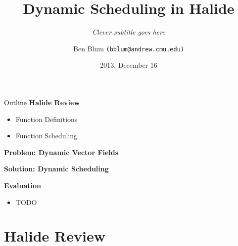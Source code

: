 \documentclass[xcolor=dvipsnames]{beamer}
\title[Dynamic Scheduling in Halide]{{\bf Dynamic Scheduling in Halide}}
\subtitle[]{ {\em Clever subtitle goes here}}
\author[Ben Blum]{Ben Blum \texttt{(bblum@andrew.cmu.edu)}}
\institute[CMU]{Carnegie Mellon University}
\date[]{2013, December 16}
\begin{document}
\renewcommand{\inserttotalframenumber}{28}
\normalem
\begin{frame}
	\titlepage
\end{frame}


\newcommand\linegap{\vspace{0.2in}}
\newcommand\breakslide[1]{\begin{frame}{} \begin{center} \Large #1 \end{center} \end{frame}}
\newcommand\related[1]{\textsuperscript{\em [#1]}}
\newcommand\hilight[2]{\color{#1}#2\color{black}}

\begin{frame}{Outline}
	\textbf{Halide Review}
	\begin{itemize}
		\item Function Definitions
		\item Function Scheduling
	\end{itemize}
	\linegap

	{\bf Problem: Dynamic Vector Fields}
	\linegap

	{\bf Solution: Dynamic Scheduling}
	\linegap

	{\bf Evaluation}
	\begin{itemize}
		\item TODO
	\end{itemize}
\end{frame}

\section{Halide Review}

\newcommand\code[1]{{\begin{center}\fbox{\begin{tabular}{l} #1 \end{tabular}} \end{center}}}

\end{document}
